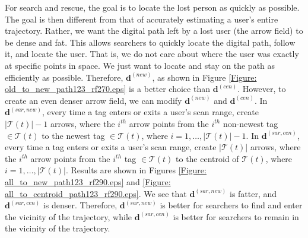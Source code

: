 For search and rescue, the goal is to locate the lost person as quickly as possible.  The goal is then different from that of accurately estimating a user's entire trajectory.  Rather, we want the digital path left by a lost user (the arrow field) to be dense and fat.  This allows searchers to quickly locate the digital path, follow it, and locate the user.  That is, we do not care about where the user was exactly at specific points in space.  We just want to locate and stay on the path as efficiently as possible.  Therefore, $\mathbf{d}^{\left(new\right)}$, as shown in Figure \ref{Figure: old_to_new_path123_rf270.eps} is a better choice than $\mathbf{d}^{\left(cen\right)}$.  However, to create an even denser arrow field, we can modify $\mathbf{d}^{\left(new\right)}$ and $\mathbf{d}^{\left(cen\right)}$.  In $\mathbf{d}^{\left(sar, new\right)}$, every time a tag enters or exits a user's scan range, create $\left| \mathcal{T}\left(t \right) \right|-1$ arrows, where the $i^{th}$ arrow points from the $i^{th}$ non-newest tag $\in \mathcal{T}\left(t \right)$ to the newest tag $\in \mathcal{T}\left(t \right)$, where $i = 1, \ldots, \left| \mathcal{T}\left(t \right) \right| -1$.  In $\mathbf{d}^{\left(sar, cen\right)}$, every time a tag enters or exits a user's scan range, create $\left| \mathcal{T}\left(t \right) \right|$ arrows, where the $i^{th}$ arrow points from the $i^{th}$ tag $\in \mathcal{T}\left(t \right)$ to the centroid of $\mathcal{T}\left(t \right)$, where $i = 1, \ldots, \left| \mathcal{T}\left(t \right) \right|$.  Results are shown in Figures \ref{Figure: all_to_new_path123_rf290.eps}  and \ref{Figure: all_to_centroid_path123_rf290.eps}.  We see that $\mathbf{d}^{\left(sar, new\right)}$ is fatter, and $\mathbf{d}^{\left(sar, cen\right)}$ is denser. Therefore, $\mathbf{d}^{\left(sar, new\right)}$ is better for searchers to find and enter the vicinity of the trajectory, while $\mathbf{d}^{\left(sar, cen\right)}$ is better for searchers to remain in the vicinity of the trajectory.

